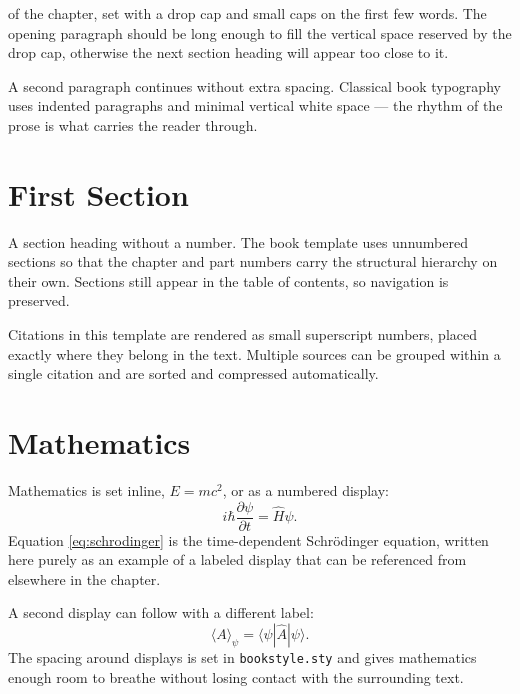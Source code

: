 
of the chapter, set with a drop cap and small caps on the first few words. The opening paragraph should be long enough to fill the vertical space reserved by the drop cap, otherwise the next section heading will appear too close to it.

A second paragraph continues without extra spacing. Classical book typography uses indented paragraphs and minimal vertical white space --- the rhythm of the prose is what carries the reader through.


\section{First Section}

A section heading without a number. The book template uses unnumbered sections so that the chapter and part numbers carry the structural hierarchy on their own. Sections still appear in the table of contents, so navigation is preserved.

Citations in this template are rendered as small superscript numbers, placed exactly where they belong in the text\cite{example-article}. Multiple sources can be grouped within a single citation and are sorted and compressed automatically\cite{example-article,example-book}.


\section{Mathematics}

Mathematics is set inline, $E = mc^2$, or as a numbered display:
\begin{equation}
  i\hbar \frac{\partial \psi}{\partial t}
  = \hat{H}\psi.
  \label{eq:schrodinger}
\end{equation}
Equation \eqref{eq:schrodinger} is the time-dependent Schr\"odinger equation, written here purely as an example of a labeled display that can be referenced from elsewhere in the chapter.

A second display can follow with a different label:
\begin{equation}
  \langle A \rangle_\psi = \langle \psi | \hat{A} | \psi \rangle.
  \label{eq:expectation}
\end{equation}
The spacing around displays is set in \texttt{bookstyle.sty} and gives mathematics enough room to breathe without losing contact with the surrounding text.

